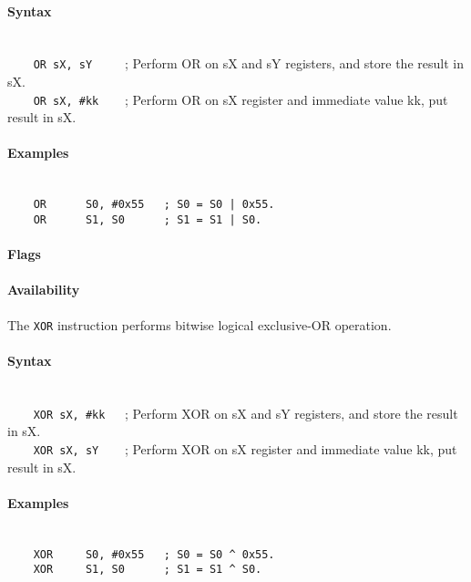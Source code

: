         \paragraph{Syntax}
            ~\\
            \verb'    OR sX, sY     '; Perform OR on sX and sY registers, and store the result in sX.\\
            \verb'    OR sX, #kk    '; Perform OR on sX register and immediate value kk, put result in sX.

        \paragraph{Examples}
            ~\\
            \verb'    OR      S0, #0x55   ; S0 = S0 | 0x55.'\\
            \verb'    OR      S1, S0      ; S1 = S1 | S0.'

        \paragraph{Flags}

        \paragraph{Availability}
            \pbavailability{\yes}{\yes}{\yes}{\yes}{\yes}

    \clearpage
        The \texttt{XOR} instruction performs bit\-wise logical exclusive-OR operation.

        \paragraph{Syntax}
            ~\\
            \verb'    XOR sX, #kk   '; Perform XOR on sX and sY registers, and store the result in sX.\\
            \verb'    XOR sX, sY    '; Perform XOR on sX register and immediate value kk, put result in sX.

        \paragraph{Examples}
            ~\\
            \verb'    XOR     S0, #0x55   ; S0 = S0 ^ 0x55.'\\
            \verb'    XOR     S1, S0      ; S1 = S1 ^ S0.'

